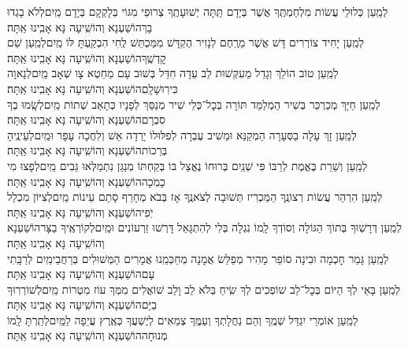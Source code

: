 \documentclass[twoside, openany, parskip=half, 11pt]{book}
\begin{document}
\begin{small}
	לְמַֽעַן כְּלוּלֵי עֲשׂוֹת מִלְחַמְתֶּֽךָ אֲשֶׁר בְּיָדָם תַּֽתָּה יְשׁוּעָתֶֽךָ\hfill\break
	צְרוּפֵי מִגּוֹי בְּלָקְקָם בְּיָדָם מַֽיִם\hfill\break לְלֹא בָגְדוּ בָךְ\hfill הוֹשַׁעְנָא וְהוֹשִֽׁיעָה נָּא אָבִֽינוּ אַֽתָּה׃\\
	לְמַֽעַן יָחִיד צוֹרְרִים דָּשׁ אֲשֶׁר מֵרֶֽחֶם לְנָזִיר הֻקְדָּשׁ\hfill\break
	מִמַּכְתֵּשׁ לֶֽחִי הִבְקַֽעְתָּ לּוֹ מַֽיִם\hfill\break לְמַֽעַן שֵׁם קׇדְשֶֽׁךָ\hfill הוֹשַׁעְנָא וְהוֹשִֽׁיעָה נָּא אָבִֽינוּ אַֽתָּה׃\\
	לְמַֽעַן טוֹב הוֹלֵךְ וְגָדֵל מֵעִקְּשׁוּת לֵב עֵדָה חִדֵּל\hfill\break
	בְּשׁוּב עָם מֵחֵטְא צָו שְׁאָב מַֽיִם\hfill\break לְנָאוָה כִּירֽוּשָׁלָֽםִ\hfill הוֹשַׁעְנָא וְהוֹשִֽׁיעָה נָּא אָבִֽינוּ אַֽתָּה׃\\
	לְמַֽעַן חַיָּךְ מְכַרְכֵּר בְּשִׁיר הַמְלַמֵּד תּוֹרָה בְּכׇל־כְּלֵי שִׁיר\hfill\break
	מְנַסֵּךְ לְפָנָיו כְּתָאַב שְׁתוֹת מַֽיִם\hfill\break לְשָֽׂמוּ בְךָ סִבְרָם\hfill הוֹשַׁעְנָא וְהוֹשִֽׁיעָה נָּא אָבִֽינוּ אַֽתָּה׃\\
	לְמַֽעַן זָךְ עָלָה בַסְּעָרָה הַמְקַנֵּא וּמֵשִׁיב עֶבְרָה\hfill\break
	לְפִלּוּלוֹ יָרְדָה אֵשׁ וְלִחֲכָה עָפָר וּמַֽיִם\hfill\break לְעֵינֶֽיהָ בְּרֵכוֹת\hfill הוֹשַׁעְנָא וְהוֹשִֽׁיעָה נָּא אָבִֽינוּ אַֽתָּה׃\\
	לְמַֽעַן וְשֵׁרֵת בֶּאֱמֶת לְרַבּוֹ פִּי שְׁנַֽיִם בְּרוּחוֹ נֶאֱצַל בּוֹ\hfill\break
	בְּקַחְתּוֹ מְנַגֵּן נִתְמַלְּאוּ גֵּבִים מַֽיִם\hfill\break לְפָצוּ מִי כָמֹֽכָה\hfill הוֹשַׁעְנָא וְהוֹשִֽׁיעָה נָּא אָבִֽינוּ אַֽתָּה׃\\
	לְמַֽעַן הִרְהֵר עֲשׂוֹת רְצוֹנֶֽךָ הַמַּכְרִיז תְּשׁוּבָה לְצֹאנֶֽךָ\hfill\break
	אָז בְּבֹא מְחָרֵף סָתַם עֵינוֹת מַֽיִם\hfill\break לְצִיּוֹן מִכְלַל יֹֽפִי\hfill הוֹשַׁעְנָא וְהוֹשִֽׁיעָה נָּא אָבִֽינוּ אַֽתָּה׃\\
	לְמַֽעַן דְּרָשֽׁוּךָ בְּתוֹךְ הַגּוֹלָה וְסוֹדְךָ לָֽמוֹ נִגְלָה\hfill\break
	בְּלִי לְהִתְגָּאֵל דָּרְשׁוּ זֵרְעוֹנִים וּמַֽיִם\hfill\break לְקוֹרְאֶֽיךָ בַצָּר\hfill הוֹשַׁעְנָא וְהוֹשִֽׁיעָה נָּא אָבִֽינוּ אַֽתָּה׃\\
	לְמַֽעַן גָּמַר חׇכְמָה וּבִינָה סוֹפֵר מָהִיר מְפַלֵּשׂ אֲמָנָה\hfill\break
	מְחַכְּמֵֽנוּ אֲמָרִים הַמְּשׁוּלִים בְּרַחֲבֵי\hfill\break מַֽיִם לְרַבָּֽתִי עָם\hfill הוֹשַׁעְנָא וְהוֹשִֽׁיעָה נָּא אָבִֽינוּ אַֽתָּה׃\\
	לְמַֽעַן בָּאֵי לְךָ הַיּוֹם בְּכׇל־לֵב שׁוֹפְכִים לְךָ שִֽׂיחַ בְּלֹא לֵב וָלֵב\hfill\break
	שׁוֹאֲלִים מִמְּךָ עוֹז מִטְרוֹת מַֽיִם\hfill\break לְשׁוֹרְרֽוּךָ בַיָּם\hfill הוֹשַׁעְנָא וְהוֹשִֽׁיעָה נָּא אָבִֽינוּ אַֽתָּה׃\\
	לְמַֽעַן אוֹמְרֵי יִגְדַּל שְׁמֶֽךָ וְהֵם נַחֲלָתְךָ וְעַמֶּֽךָ\hfill\break
	צְמֵאִים לְיֶשְׁעֲךָ כְּאֶֽרֶץ עֲיֵפָה לַמַּֽיִם\hfill\break לְתַֽרְתָּ לָֽמוֹ מְנוּחָה\hfill הוֹשַׁעְנָא וְהוֹשִֽׁיעָה נָּא אָבִֽינוּ אַֽתָּה׃\\
	
\end{small}
\end{document}
